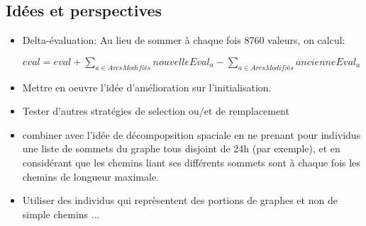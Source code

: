 \documentclass[a4paper]{report}
\begin{document}
\subsection{Idées et perspectives}
\begin{itemize}
  \item Delta-évaluation: Au lieu de sommer à chaque fois 8760 valeurs, on calcul:
  \begin{center}
     $eval= eval + \sum_{a \in ArcsModifiés} nouvelleEval_a - \sum_{a \in ArcsModifiés} ancienneEval_a$
    
  \end{center}
  \item Mettre en oeuvre l'idée d'amélioration sur l'initialisation.
  \item Tester d'autres stratégies de selection ou/et de remplacement
  \item combiner avec l'idée de décompopsition spaciale en ne prenant pour individus une liste de sommets du graphe tous disjoint de 24h (par exemple), et en considérant que les chemins liant ses différents sommets sont à chaque fois les chemins de longueur maximale.
  
  \item Utiliser des individus qui reprèsentent des portions de graphes et non de simple chemins ...
  
\end{itemize}
\end{document}
